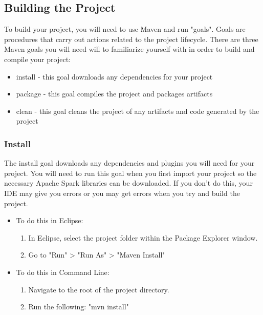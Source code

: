 \documentclass{article}
\begin{document}
\subsection{Building the Project}
To build your project, you will need to use Maven and run "goals". Goals are procedures that carry out actions related to the project lifecycle. There are three Maven goals you will need will to familiarize yourself with in order to build and compile your project:
\begin{itemize}
\item install - this goal downloads any dependencies for your project
\item package - this goal compiles the project and packages artifacts
\item clean - this goal cleans the project of any artifacts and code generated by the project
\end{itemize}

\subsubsection*{Install}
The install goal downloads any dependencies and plugins you will need for your project. You will need to run this goal when you first import your project so the necessary Apache Spark libraries can be downloaded. If you don't do this, your IDE may give you errors or you may get errors when you try and build the project. 
\begin{itemize}
\item To do this in Eclipse:
	\begin{enumerate}
	\item In Eclipse, select the project folder within the Package Explorer window.
	\item Go to "Run" > "Run As" > "Maven Install"
	\end{enumerate}
\item To do this in Command Line:
	\begin{enumerate}
	\item Navigate to the root of the project directory.
	\item Run the following: "mvn install"
	\end{enumerate}
\end{itemize}
\end{document}
